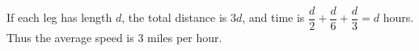 If each leg has length $d$, the total distance is $3d$, and time is $\dfrac{d}{2}+\dfrac{d}{6}+\dfrac{d}{3}=d$ hours. Thus the average speed is $\boxed3$ miles per hour.

